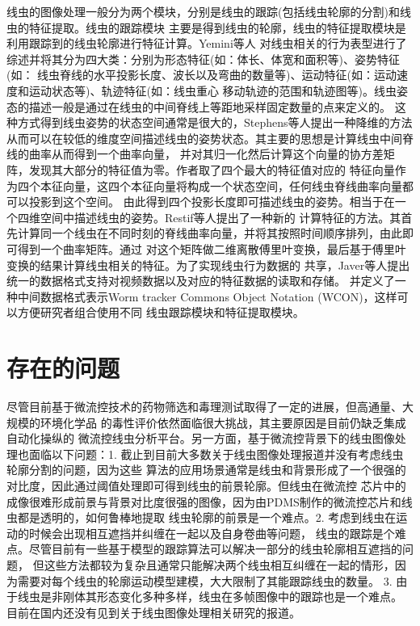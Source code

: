 	线虫的图像处理一般分为两个模块，分别是线虫的跟踪(包括线虫轮廓的分割)和线虫的特征提取。线虫的跟踪模块
	主要是得到线虫的轮廓，线虫的特征提取模块是利用跟踪到的线虫轮廓进行特征计算。Yemini等人\cite{yemini2013database}
	对线虫相关的行为表型进行了综述并将其分为四大类：分别为形态特征(如：体长、体宽和面积等)、姿势特征(如：
	线虫脊线的水平投影长度、波长以及弯曲的数量等)、运动特征(如：运动速度和运动状态等)、轨迹特征(如：线虫重心
	移动轨迹的范围和轨迹图等)。线虫姿态的描述一般是通过在线虫的中间脊线上等距地采样固定数量的点来定义的。
	这种方式得到线虫姿势的状态空间通常是很大的，Stephens等人\cite{Stephens2008Dimensionality}提出一种降维的方法
	从而可以在较低的维度空间描述线虫的姿势状态。其主要的思想是计算线虫中间脊线的曲率从而得到一个曲率向量，
	并对其归一化然后计算这个向量的协方差矩阵，发现其大部分的特征值为零。作者取了四个最大的特征值对应的
	特征向量作为四个本征向量，这四个本征向量将构成一个状态空间，任何线虫脊线曲率向量都可以投影到这个空间。
	由此得到四个投影长度即可描述线虫的姿势。相当于在一个四维空间中描述线虫的姿势。Restif等人\cite{Restif2014CeleST}提出了一种新的
	计算特征的方法。其首先计算同一个线虫在不同时刻的脊线曲率向量，并将其按照时间顺序排列，由此即可得到一个曲率矩阵。通过
	对这个矩阵做二维离散傅里叶变换，最后基于傅里叶变换的结果计算线虫相关的特征。为了实现线虫行为数据的
	共享，Javer等人\cite{Javer2018An}提出统一的数据格式支持对视频数据以及对应的特征数据的读取和存储。
	并定义了一种中间数据格式表示Worm tracker Commons Object Notation (WCON)，这样可以方便研究者组合使用不同
	线虫跟踪模块和特征提取模块。
\section{存在的问题}
\label{sec:intro:analog}
	 尽管目前基于微流控技术的药物筛选和毒理测试取得了一定的进展，但高通量、大规模的环境化学品
	 的毒性评价依然面临很大挑战，其主要原因是目前仍缺乏集成自动化操纵的
	 微流控线虫分析平台。另一方面，基于微流控背景下的线虫图像处理也面临以下问题：1. 截止到目前大多数关于线虫图像处理报道并没有考虑线虫轮廓分割的问题，因为这些
算法的应用场景通常是线虫和背景形成了一个很强的对比度，因此通过阈值处理即可得到线虫的前景轮廓。但线虫在微流控
芯片中的成像很难形成前景与背景对比度很强的图像，因为由PDMS制作的微流控芯片和线虫都是透明的，如何鲁棒地提取
线虫轮廓的前景是一个难点。2. 考虑到线虫在运动的时候会出现相互遮挡并纠缠在一起以及自身卷曲等问题，
线虫的跟踪是个难点。尽管目前有一些基于模型的跟踪算法可以解决一部分的线虫轮廓相互遮挡的问题，
但这些方法都较为复杂且通常只能解决两个线虫相互纠缠在一起的情形，因为需要对每个线虫的轮廓运动模型建模，大大限制了其能跟踪线虫的数量。
3. 由于线虫是非刚体其形态变化多种多样，线虫在多帧图像中的跟踪也是一个难点。
目前在国内还没有见到关于线虫图像处理相关研究的报道。

